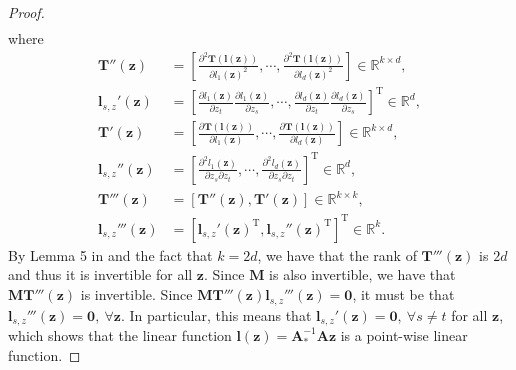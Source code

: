 \documentclass[10pt]{article} %
\theoremstyle{plain}
\theoremstyle{definition}
\begin{document}
\begin{proof}
\begin{align}
    \end{align}
    where
    \begin{align}
        \mathbf{T}''(\mathbf{z})&=\left[\frac{\partial^2 \mathbf{T}(\mathbf{l}(\mathbf{z}))}{\partial l_1(\mathbf{z})^2},\cdots,\frac{\partial^2 \mathbf{T}(\mathbf{l}(\mathbf{z}))}{\partial l_d(\mathbf{z})^2}\right]\in\mathbb{R}^{k\times d},\\
        \mathbf{l}_{s,z}'(\mathbf{z})&=\left[\frac{\partial l_1(\mathbf{z})}{\partial z_t} \frac{\partial l_1(\mathbf{z})}{\partial z_s},\cdots,\frac{\partial l_d(\mathbf{z})}{\partial z_t} \frac{\partial l_d(\mathbf{z})}{\partial z_s}\right]^{\text{T}}\in\mathbb{R}^{d},\\
        \mathbf{T}'(\mathbf{z})&=\left[\frac{\partial \mathbf{T}(\mathbf{l}(\mathbf{z}))}{\partial l_1(\mathbf{z})},\cdots,\frac{\partial \mathbf{T}(\mathbf{l}(\mathbf{z}))}{\partial l_d(\mathbf{z})}\right]\in\mathbb{R}^{k\times d},\\
        \mathbf{l}_{s,z}''(\mathbf{z})&=\left[\frac{\partial^2 l_1(\mathbf{z})}{\partial z_s \partial z_t},\cdots,\frac{\partial^2 l_d(\mathbf{z})}{\partial z_s \partial z_t}\right]^{\text{T}}\in\mathbb{R}^{d},\\
        \mathbf{T}'''(\mathbf{z})&=[\mathbf{T}''(\mathbf{z}),\mathbf{T}'(\mathbf{z})]\in\mathbb{R}^{k\times k},\\
        \mathbf{l}_{s,z}'''(\mathbf{z})&=[\mathbf{l}_{s,z}'(\mathbf{z})^{\text{T}},\mathbf{l}_{s,z}''(\mathbf{z})^{\text{T}}]^{\text{T}}\in\mathbb{R}^{k}.
    \end{align}
    By Lemma 5 in \citet{Khemakhem_Kingma_Monti_Hyvarinen_2020} and the fact that $k=2d$, we have that the rank of $\mathbf{T}'''(\mathbf{z})$ is $2d$ and thus it is invertible for all $\mathbf{z}$. Since $\mathbf{M}$ is also invertible, we have that $\mathbf{M}\mathbf{T}'''(\mathbf{z})$ is invertible. Since $\mathbf{M}\mathbf{T}'''(\mathbf{z})\mathbf{l}_{s,z}'''(\mathbf{z})=\mathbf{0}$, it must be that $\mathbf{l}_{s,z}'''(\mathbf{z})=\mathbf{0},~\forall\mathbf{z}$. In particular, this means that $\mathbf{l}_{s,z}'(\mathbf{z})=\mathbf{0},~\forall s\not=t$ for all $\mathbf{z}$, which shows that the linear function $\mathbf{l}(\mathbf{z})=\mathbf{A}_{*}^{-1}\mathbf{A}\mathbf{z}$ is a point-wise linear function.
    

\end{proof}
\end{document}
